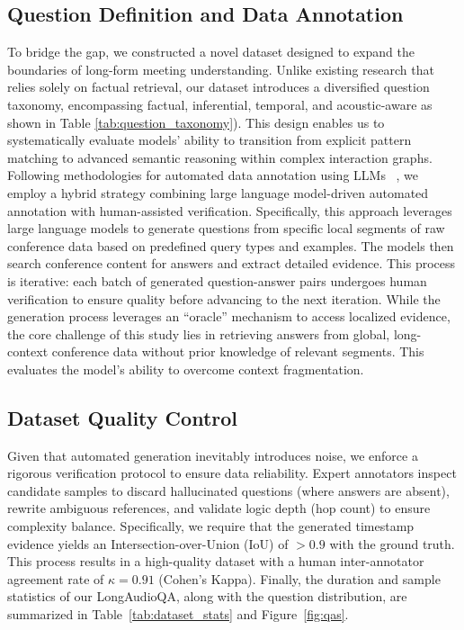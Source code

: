 \documentclass[11pt]{article}
\begin{document}
\subsection{Question Definition and Data Annotation}
To bridge the gap, we constructed a novel dataset designed to expand the boundaries of long-form meeting understanding. Unlike existing research that relies solely on factual retrieval, our dataset introduces a diversified question taxonomy, encompassing factual, inferential, temporal, and acoustic-aware as shown in Table \ref{tab:question_taxonomy}). This design enables us to systematically evaluate models' ability to transition from explicit pattern matching to advanced semantic reasoning within complex interaction graphs.
Following methodologies for automated data annotation using LLMs ~\cite{icml/00040C0SRC00PY025,icml/00040S0CG0CZY0025}, we employ a hybrid strategy combining large language model-driven automated annotation with human-assisted verification. Specifically, this approach leverages large language models to generate questions from specific local segments of raw conference data based on predefined query types and examples. The models then search conference content for answers and extract detailed evidence. This process is iterative: each batch of generated question-answer pairs undergoes human verification to ensure quality before advancing to the next iteration. While the generation process leverages an “oracle” mechanism to access localized evidence, the core challenge of this study lies in retrieving answers from global, long-context conference data without prior knowledge of relevant segments. This evaluates the model's ability to overcome context fragmentation.

\subsection{Dataset Quality Control}

Given that automated generation inevitably introduces noise, we enforce a rigorous verification protocol to ensure data reliability. Expert annotators inspect candidate samples to discard hallucinated questions (where answers are absent), rewrite ambiguous references, and validate logic depth (hop count) to ensure complexity balance. Specifically, we require that the generated timestamp evidence yields an Intersection-over-Union (IoU) of \( > 0.9 \) with the ground truth. This process results in a high-quality dataset with a human inter-annotator agreement rate of \( \kappa = 0.91 \) (Cohen's Kappa). Finally, the duration and sample statistics of our LongAudioQA, along with the question distribution, are summarized in Table~\ref{tab:dataset_stats} and Figure~\ref{fig:qas}.
\end{document}
